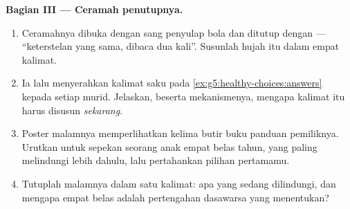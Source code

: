 \begin{problem}
\medskip\noindent\textbf{Bagian III --- Ceramah
penutupnya.}
\begin{enumerate}[resume]
  \item Ceramahnya dibuka dengan sang penyulap bola dan
        ditutup dengan  --- ``keterstelan yang
        sama, dibaca dua kali''. Susunlah hujah itu dalam
        empat kalimat.
  \item Ia lalu menyerahkan kalimat saku pada
        \cref{ex:g5:healthy-choices:answers} kepada setiap
        murid. Jelaskan, beserta mekanismenya, mengapa
        kalimat itu harus disusun \emph{sekarang}.
  \item Poster malamnya memperlihatkan kelima butir buku
        panduan pemiliknya. Urutkan untuk sepekan seorang
        anak empat belas tahun, yang paling melindungi lebih
        dahulu, lalu pertahankan pilihan pertamamu.
  \item Tutuplah malamnya dalam satu kalimat: apa yang
        sedang dilindungi, dan mengapa empat belas adalah
        pertengahan dasawarsa yang menentukan?
\end{enumerate}
\end{problem}
